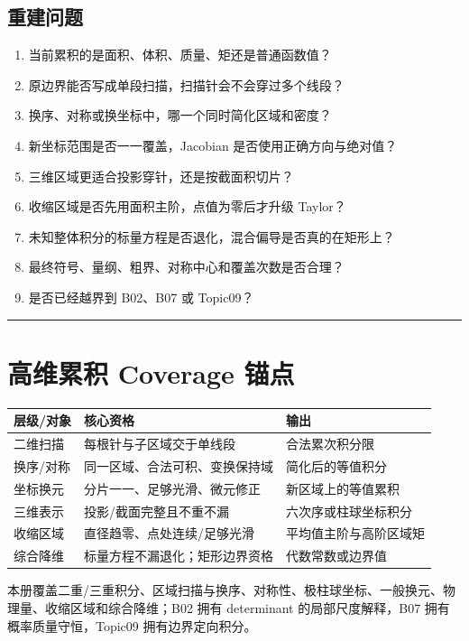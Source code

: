 \documentclass[11pt,a4paper,fontset=fandol]{ctexart}
\begin{document}
\subsection{重建问题}
\begin{enumerate}
  \item 当前累积的是面积、体积、质量、矩还是普通函数值？
  \item 原边界能否写成单段扫描，扫描针会不会穿过多个线段？
  \item 换序、对称或换坐标中，哪一个同时简化区域和密度？
  \item 新坐标范围是否一一覆盖，Jacobian 是否使用正确方向与绝对值？
  \item 三维区域更适合投影穿针，还是按截面积切片？
  \item 收缩区域是否先用面积主阶，点值为零后才升级 Taylor？
  \item 未知整体积分的标量方程是否退化，混合偏导是否真的在矩形上？
  \item 最终符号、量纲、粗界、对称中心和覆盖次数是否合理？
  \item 是否已经越界到 B02、B07 或 Topic09？
\end{enumerate}

\begin{center}\rule{0.5\linewidth}{0.5pt}\end{center}
\appendix
\section{高维累积 Coverage 锚点}
\begin{center}
\begin{tabular}{L{2.55cm}L{5.15cm}L{\dimexpr\linewidth-7.70cm\relax}}
\toprule
层级/对象 & 核心资格 & 输出\\
\midrule
二维扫描 & 每根针与子区域交于单线段 & 合法累次积分限\\
换序/对称 & 同一区域、合法可积、变换保持域 & 简化后的等值积分\\
坐标换元 & 分片一一、足够光滑、微元修正 & 新区域上的等值累积\\
三维表示 & 投影/截面完整且不重不漏 & 六次序或柱球坐标积分\\
收缩区域 & 直径趋零、点处连续/足够光滑 & 平均值主阶与高阶区域矩\\
综合降维 & 标量方程不漏退化；矩形边界资格 & 代数常数或边界值\\
\bottomrule
\end{tabular}
\end{center}

本册覆盖二重/三重积分、区域扫描与换序、对称性、极柱球坐标、一般换元、物理量、收缩区域和综合降维；B02 拥有 determinant 的局部尺度解释，B07 拥有概率质量守恒，Topic09 拥有边界定向积分。
\end{document}
